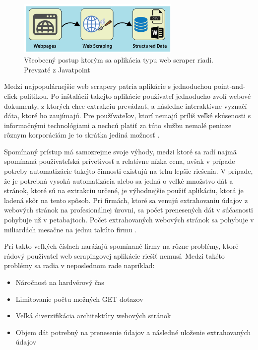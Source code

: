 \begin{figure}[hbt]
	\centering
	\includegraphics[width=0.7\textwidth]{obrazky-figures/web-scraping-using-python.png}
	\caption{Všeobecný postup ktorým sa aplikácia typu web scraper riadi. Prevzaté z Javatpoint \cite{WebScrap}}
	\label{WebScrap_img}
\end{figure}

\bigskip

Medzi najpopulárnejšie web scrapery patria aplikácie s jednoduchou point-and-click politikou. Po inštalácií takejto aplikácie používateľ jednoducho zvolí webové dokumenty, z ktorých chce extrakciu prevádzať, a následne interaktívne vyznačí dáta, ktoré ho zaujímajú. Pre používateľov, ktorí nemajú príliš veľké skúsenosti s informačnými technológiami a nechcú platiť za túto službu nemalé peniaze rôznym korporáciám je to skrátka jediná možnosť \cite{scrapers}.

\bigskip

Spomínaný prístup má samozrejme svoje výhody, medzi ktoré sa radí najmä spomínaná používateľská prívetivosť a relatívne nízka cena, avšak v prípade potreby automatizácie takejto činnosti existujú na trhu lepšie riešenia. V prípade, že je potrebná vysoká automatizácia alebo sa jedná o veľké množstvo dát a stránok, ktoré sú na extrakciu určené, je výhodnejšie použiť aplikáciu, ktorá je ladená skôr na tento spôsob. Pri firmách, ktoré sa venujú extrahovaniu údajov z webových stránok na profesionálnej úrovni, sa počet prenesených dát v súčasnosti pohybuje už v petabajtoch. Počet extrahovaných webových stránok sa pohybuje v miliardách mesačne na jednu takúto firmu \cite{JanCurna:online}.

Pri takto veľkých číslach narážajú spomínané firmy na rôzne problémy, ktoré rádový používateľ web scrapingovej aplikácie riešiť nemusí. Medzi takéto problémy sa radia v neposlednom rade napríklad:
\begin{itemize}
    \item {Náročnosť na hardvérový čas}
    \item {Limitovanie počtu možných GET dotazov}
    \item {Veľká diverzifikácia architektúry webových stránok}
    \item {Objem dát potrebný na prenesenie údajov a následné uloženie extrahovaných údajov}
\end{itemize}

